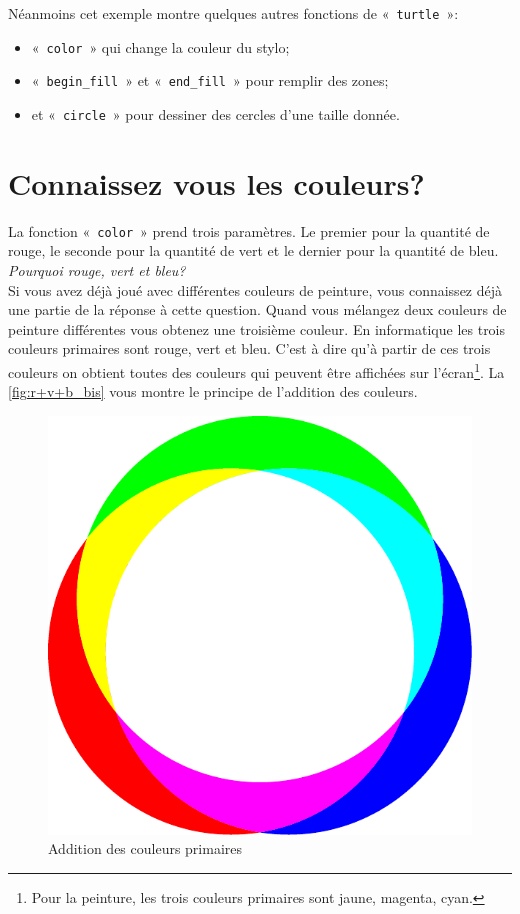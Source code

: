 Néanmoins cet exemple montre quelques autres fonctions de « \texttt{turtle} »:
\begin{itemize}
\item « \texttt{color} » qui change la couleur du stylo;
\item « \texttt{begin\_fill} » et « \texttt{end\_fill} » pour remplir des zones;
\item et « \texttt{circle} » pour dessiner des cercles d'une taille donnée.
\end{itemize}


\section{Connaissez vous les couleurs?}

La fonction « \texttt{color} » prend trois paramètres. Le premier pour la quantité de rouge, le seconde pour la quantité de vert et le dernier pour la quantité de bleu.\\

\emph{Pourquoi rouge, vert et bleu?}\\


Si vous avez déjà joué avec différentes couleurs de peinture, vous connaissez déjà une partie de la réponse à cette question. Quand vous mélangez deux couleurs de peinture différentes vous obtenez une troisième couleur. En informatique les trois couleurs primaires sont rouge, vert et bleu. C'est à dire qu'à partir de ces trois couleurs on obtient toutes des couleurs qui peuvent être affichées sur l'écran\footnote{Pour la peinture, les trois couleurs primaires sont jaune, magenta, cyan.}. La \autoref{fig:r+v+b_bis} vous montre le principe de l'addition des couleurs.

\begin{figure}[h!]
\centering
\includegraphics[scale=0.6]{images/r+v+b_bis}
\caption{Addition des couleurs primaires}\label{fig:r+v+b_bis}
\end{figure}


